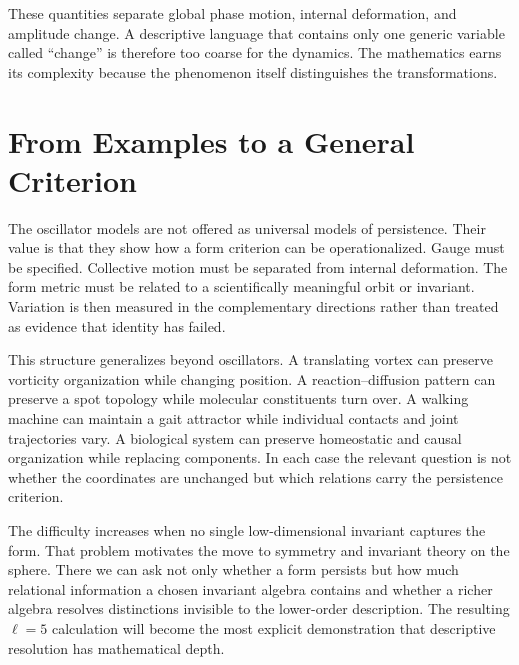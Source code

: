 These quantities separate global phase motion, internal deformation, and amplitude change. A descriptive language that contains only one generic variable called ``change'' is therefore too coarse for the dynamics. The mathematics earns its complexity because the phenomenon itself distinguishes the transformations.

\section{From Examples to a General Criterion}

The oscillator models are not offered as universal models of persistence. Their value is that they show how a form criterion can be operationalized. Gauge must be specified. Collective motion must be separated from internal deformation. The form metric must be related to a scientifically meaningful orbit or invariant. Variation is then measured in the complementary directions rather than treated as evidence that identity has failed.

This structure generalizes beyond oscillators. A translating vortex can preserve vorticity organization while changing position. A reaction--diffusion pattern can preserve a spot topology while molecular constituents turn over. A walking machine can maintain a gait attractor while individual contacts and joint trajectories vary. A biological system can preserve homeostatic and causal organization while replacing components. In each case the relevant question is not whether the coordinates are unchanged but which relations carry the persistence criterion.

The difficulty increases when no single low-dimensional invariant captures the form. That problem motivates the move to symmetry and invariant theory on the sphere. There we can ask not only whether a form persists but how much relational information a chosen invariant algebra contains and whether a richer algebra resolves distinctions invisible to the lower-order description. The resulting $\ell=5$ calculation will become the most explicit demonstration that descriptive resolution has mathematical depth.
